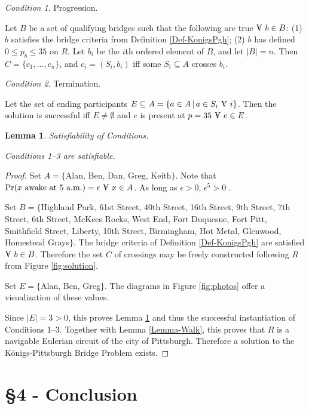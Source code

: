 \documentclass[twocolumn]{article}
\renewcommand\forall{\raisebox{\depth}{\rotatebox{180}{A}}}
\theoremstyle{plain}  %
\newtheorem{lemma}{Lemma}
\theoremstyle{definition}  %
\theoremstyle{remark}  %
\newtheorem{cond}{Condition}
\begin{document}
\begin{cond}
	\label{cond:prog}
Progression.

Let $B$ be a set of qualifying bridges such that the following are true $\forall~b \in B$:  (1) $b$ satisfies the bridge criteria from Definition \ref{Def-KonigsPgh}; (2) $b$ has defined $0 \leq p_b \leq 35$ on $R$.  Let $b_i$ be the $i$th ordered element of $B$, and let $|B| = n$.  Then $C = \{c_1, ..., c_n\}$, and $c_i = (S_i, b_i)$ iff some $S_i \subseteq A$ crosses $b_i$.
\end{cond}

\begin{cond}
	\label{cond:term}
Termination.

Let the set of ending participants $E \subseteq A = \{ a \in A\,|\, a \in S_i\ \forall~i \}$.  Then the solution is successful iff $E \neq \emptyset$ and $e$ is present at $p = 35\ \forall~e \in E$.
\end{cond}

\begin{lemma}
Satisfiability of Conditions.

Conditions 1--3 are satisfiable.
\label{lem:satisf}

\end{lemma}
\begin{proof}
	Set $A = \{$Alan, Ben, Dan, Greg, Keith$\}$. Note that $\Pr(x~\mathrm{awake~at~5~a.m.}) = \epsilon\ \forall~x \in A$. As long as $\epsilon > 0$, $\epsilon^5 > 0$ \cite{what-is-epsilon}.

Set $B = \{$Highland Park, 61st Street, 40th Street, 16th Street, 9th Street, 7th Street, 6th Street, McKees Rocks, West End, Fort Duquesne, Fort Pitt, Smithfield Street, Liberty, 10th Street, Birmingham, Hot Metal, Glenwood, Homestead Grays$\}$.
The bridge criteria of Definition \ref{Def-KonigsPgh} are satisfied $\forall~b \in B$. Therefore the set $C$ of crossings may be freely constructed following $R$ from Figure \ref{fig:solution}.

Set $E = \{$Alan, Ben, Greg$\}$.
The diagrams in Figure \ref{fig:photos} offer a visualization of these values.

Since $|E| = 3 > 0$, this proves Lemma \ref{lem:satisf} and thus the successful instantiation of Conditions 1--3.  Together with Lemma \ref{Lemma-Walk}, this proves that $R$ is a navigable Eulerian circuit of the city of Pittsburgh.  Therefore a solution to the K\"onigs-Pittsburgh Bridge Problem exists.
\end{proof}

\section*{\S 4 - Conclusion}
\end{document}
